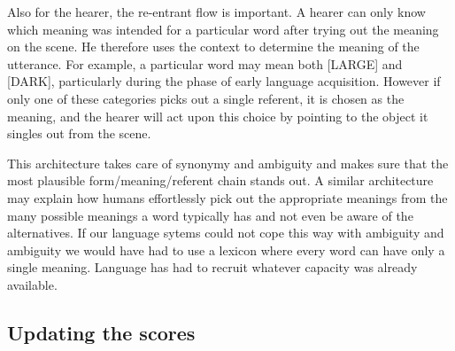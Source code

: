 Also for the hearer, the re-entrant flow is important. 
A hearer can only know which meaning was intended for a particular
word after trying out the meaning on the scene. He
therefore uses the context to determine the meaning of 
the utterance. For example, a particular word may mean both [LARGE]
and [DARK], particularly during the phase of 
early language acquisition. However if only one of these categories
picks out a single referent, it is chosen as 
the meaning, and the hearer will act upon this choice by 
pointing to the object it singles out from the scene. 

This architecture takes care of synonymy and ambiguity and
makes sure that the most plausible form/meaning/referent
chain stands out. A similar architecture may explain how
humans effortlessly pick out the appropriate meanings from 
the many possible meanings a word typically has and not even 
be aware of the alternatives. If our language sytems 
could not cope this way with ambiguity and ambiguity we 
would have had to use a lexicon where every word can 
have only a single meaning. Language has had to 
recruit whatever capacity was already available. 

\subsection{Updating the scores}


